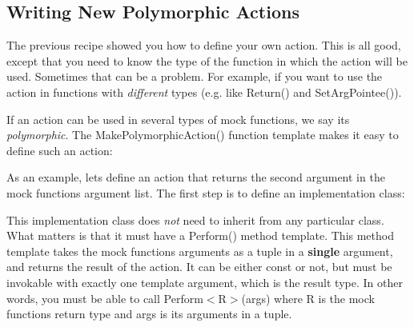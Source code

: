 \subsection*{Writing New Polymorphic Actions}

The previous recipe showed you how to define your own action. This is all good, except that you need to know the type of the function in which the action will be used. Sometimes that can be a problem. For example, if you want to use the action in functions with {\itshape different} types (e.\+g. like {\ttfamily Return()} and {\ttfamily Set\+Arg\+Pointee()}).

If an action can be used in several types of mock functions, we say it\textquotesingle{}s {\itshape polymorphic}. The {\ttfamily Make\+Polymorphic\+Action()} function template makes it easy to define such an action\+:


\begin{DoxyCode}{0}
\DoxyCodeLine{}
\DoxyCodeLine{}
\end{DoxyCode}


As an example, let\textquotesingle{}s define an action that returns the second argument in the mock function\textquotesingle{}s argument list. The first step is to define an implementation class\+:


\begin{DoxyCode}{0}
\DoxyCodeLine{  \}}
\DoxyCodeLine{\};}
\end{DoxyCode}


This implementation class does {\itshape not} need to inherit from any particular class. What matters is that it must have a {\ttfamily Perform()} method template. This method template takes the mock function\textquotesingle{}s arguments as a tuple in a {\bfseries single} argument, and returns the result of the action. It can be either {\ttfamily const} or not, but must be invokable with exactly one template argument, which is the result type. In other words, you must be able to call {\ttfamily Perform$<$R$>$(args)} where {\ttfamily R} is the mock function\textquotesingle{}s return type and {\ttfamily args} is its arguments in a tuple.

